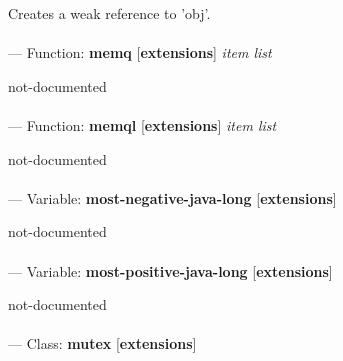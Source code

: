 \begin{adjustwidth}{5em}{5em}
Creates a weak reference to 'obj'.
\end{adjustwidth}

\paragraph{}
\label{EXTENSIONS:MEMQ}
--- Function: \textbf{memq} [\textbf{extensions}] \textit{item list}

\begin{adjustwidth}{5em}{5em}
not-documented
\end{adjustwidth}

\paragraph{}
\label{EXTENSIONS:MEMQL}
--- Function: \textbf{memql} [\textbf{extensions}] \textit{item list}

\begin{adjustwidth}{5em}{5em}
not-documented
\end{adjustwidth}

\paragraph{}
\label{EXTENSIONS:MOST-NEGATIVE-JAVA-LONG}
--- Variable: \textbf{most-negative-java-long} [\textbf{extensions}] \textit{}

\begin{adjustwidth}{5em}{5em}
not-documented
\end{adjustwidth}

\paragraph{}
\label{EXTENSIONS:MOST-POSITIVE-JAVA-LONG}
--- Variable: \textbf{most-positive-java-long} [\textbf{extensions}] \textit{}

\begin{adjustwidth}{5em}{5em}
not-documented
\end{adjustwidth}

\paragraph{}
\label{EXTENSIONS:MUTEX}
--- Class: \textbf{mutex} [\textbf{extensions}] \textit{}

